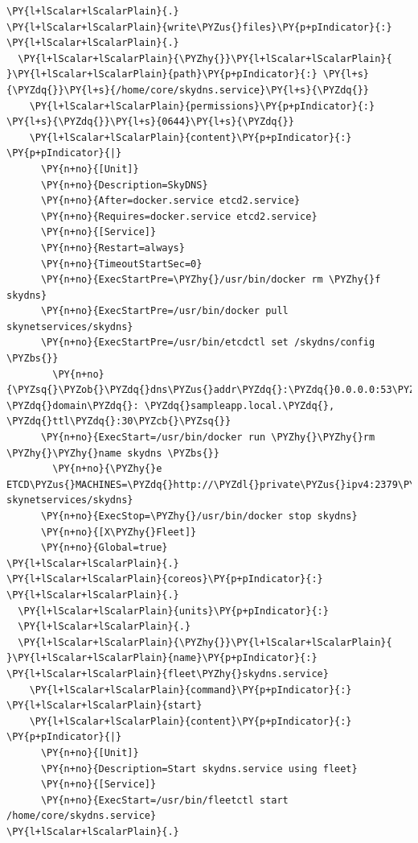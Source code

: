 \begin{codelisting}
\label{code:user-data-skydns}
\begin{Verbatim}[fontsize=\relsize{-2.5},fontseries=b,commandchars=\\\{\}]
\PY{l+lScalar+lScalarPlain}{.}
\PY{l+lScalar+lScalarPlain}{write\PYZus{}files}\PY{p+pIndicator}{:}
\PY{l+lScalar+lScalarPlain}{.}
  \PY{l+lScalar+lScalarPlain}{\PYZhy{}}\PY{l+lScalar+lScalarPlain}{ }\PY{l+lScalar+lScalarPlain}{path}\PY{p+pIndicator}{:} \PY{l+s}{\PYZdq{}}\PY{l+s}{/home/core/skydns.service}\PY{l+s}{\PYZdq{}}
    \PY{l+lScalar+lScalarPlain}{permissions}\PY{p+pIndicator}{:} \PY{l+s}{\PYZdq{}}\PY{l+s}{0644}\PY{l+s}{\PYZdq{}}
    \PY{l+lScalar+lScalarPlain}{content}\PY{p+pIndicator}{:} \PY{p+pIndicator}{|}
      \PY{n+no}{[Unit]}
      \PY{n+no}{Description=SkyDNS}
      \PY{n+no}{After=docker.service etcd2.service}
      \PY{n+no}{Requires=docker.service etcd2.service}
      \PY{n+no}{[Service]}
      \PY{n+no}{Restart=always}
      \PY{n+no}{TimeoutStartSec=0}
      \PY{n+no}{ExecStartPre=\PYZhy{}/usr/bin/docker rm \PYZhy{}f skydns}
      \PY{n+no}{ExecStartPre=/usr/bin/docker pull skynetservices/skydns}
      \PY{n+no}{ExecStartPre=/usr/bin/etcdctl set /skydns/config \PYZbs{}}
        \PY{n+no}{\PYZsq{}\PYZob{}\PYZdq{}dns\PYZus{}addr\PYZdq{}:\PYZdq{}0.0.0.0:53\PYZdq{}, \PYZdq{}domain\PYZdq{}: \PYZdq{}sampleapp.local.\PYZdq{}, \PYZdq{}ttl\PYZdq{}:30\PYZcb{}\PYZsq{}}
      \PY{n+no}{ExecStart=/usr/bin/docker run \PYZhy{}\PYZhy{}rm \PYZhy{}\PYZhy{}name skydns \PYZbs{}}
        \PY{n+no}{\PYZhy{}e ETCD\PYZus{}MACHINES=\PYZdq{}http://\PYZdl{}private\PYZus{}ipv4:2379\PYZdq{} skynetservices/skydns}
      \PY{n+no}{ExecStop=\PYZhy{}/usr/bin/docker stop skydns}
      \PY{n+no}{[X\PYZhy{}Fleet]}
      \PY{n+no}{Global=true}
\PY{l+lScalar+lScalarPlain}{.}
\PY{l+lScalar+lScalarPlain}{coreos}\PY{p+pIndicator}{:}
\PY{l+lScalar+lScalarPlain}{.}
  \PY{l+lScalar+lScalarPlain}{units}\PY{p+pIndicator}{:}
  \PY{l+lScalar+lScalarPlain}{.}
  \PY{l+lScalar+lScalarPlain}{\PYZhy{}}\PY{l+lScalar+lScalarPlain}{ }\PY{l+lScalar+lScalarPlain}{name}\PY{p+pIndicator}{:} \PY{l+lScalar+lScalarPlain}{fleet\PYZhy{}skydns.service}
    \PY{l+lScalar+lScalarPlain}{command}\PY{p+pIndicator}{:} \PY{l+lScalar+lScalarPlain}{start}
    \PY{l+lScalar+lScalarPlain}{content}\PY{p+pIndicator}{:} \PY{p+pIndicator}{|}
      \PY{n+no}{[Unit]}
      \PY{n+no}{Description=Start skydns.service using fleet}
      \PY{n+no}{[Service]}
      \PY{n+no}{ExecStart=/usr/bin/fleetctl start /home/core/skydns.service}
\PY{l+lScalar+lScalarPlain}{.}
\end{Verbatim}
\end{codelisting}

